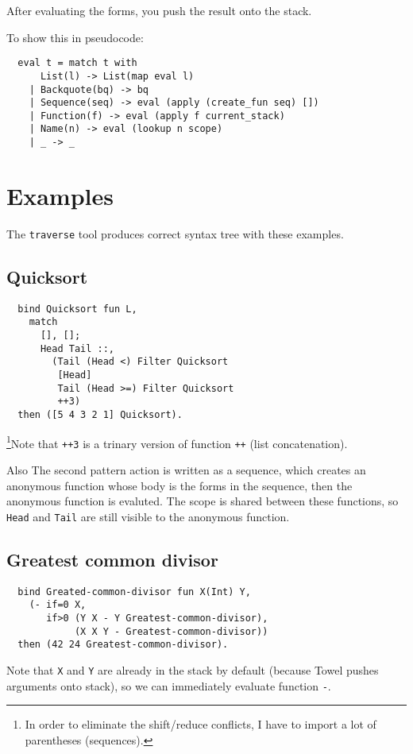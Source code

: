 \documentclass{article}
\begin{document}
After evaluating the forms, you push the result onto the stack.

To show this in pseudocode:
\begin{verbatim}
  eval t = match t with
      List(l) -> List(map eval l)
    | Backquote(bq) -> bq
    | Sequence(seq) -> eval (apply (create_fun seq) [])
    | Function(f) -> eval (apply f current_stack)
    | Name(n) -> eval (lookup n scope)
    | _ -> _
\end{verbatim}

\section{Examples}

The \texttt{traverse} tool produces correct syntax tree with these examples.

\subsection{Quicksort}
\begin{verbatim}
  bind Quicksort fun L,
    match
      [], [];
      Head Tail ::,
        (Tail (Head <) Filter Quicksort
         [Head]
         Tail (Head >=) Filter Quicksort
         ++3)
  then ([5 4 3 2 1] Quicksort).
\end{verbatim}

\footnote{In order to eliminate the shift/reduce conflicts, I have to import a lot of parentheses (sequences).}Note that \texttt{++3} is a trinary version of function \texttt{++} (list concatenation).

Also The second pattern action is written as a sequence, which creates an anonymous function whose body is the forms in the sequence, then the anonymous function is evaluted. The scope is shared between these functions, so \texttt{Head} and \texttt{Tail} are still visible to the anonymous function.

\subsection{Greatest common divisor}
\begin{verbatim}
  bind Greated-common-divisor fun X(Int) Y,
    (- if=0 X,
       if>0 (Y X - Y Greatest-common-divisor),
            (X X Y - Greatest-common-divisor))
  then (42 24 Greatest-common-divisor).
\end{verbatim}

Note that \texttt{X} and \texttt{Y} are already in the stack by default (because Towel pushes arguments onto stack), so we can immediately evaluate function \texttt{-}.
\end{document}
